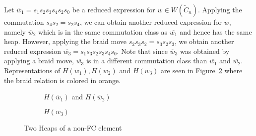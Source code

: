 \begin{example}
Let $\overline{w}_1=s_1s_2s_3s_4s_2s_0$ be a reduced expression for $w \in W(\widetilde{C}_n)$. Applying the commutation $s_4s_2=s_2s_4$, we can obtain another reduced expression for $w$, namely $\overline{w}_2$ which is in the same commutation class as $\overline{w_1}$ and hence has the same heap. However, applying the braid move $s_2s_3s_2=s_3s_2s_3$, we obtain another reduced expression $\overline{w_3}=s_1s_3s_2s_3s_4s_0$. Note that since $\overline{w}_3$ was obtained by applying a braid move, $\overline{w_3}$ is in a different commutation class than $\overline{w_1}$ and $\overline{w_2}$. Representations of $H(\overline{w}_1), H(\overline{w}_2)$ and $H(\overline{w_3})$ are seen in Figure~\ref{fig:not FC} where the braid relation is colored in orange.

\begin{figure}[h]
\centering
\begin{subfigure}[b]{0.3\textwidth}	
\centering
{}
\caption{$H(\overline{w}_1)$ and $H(\overline{w}_2)$}
\end{subfigure}
\begin{subfigure}[b]{0.3\textwidth}	
\centering
{}
\caption{$H(\overline{w}_3)$}
\label{fig:not FC}
\end{subfigure}
\caption{Two Heaps of a non-FC element}	
\end{figure}

\end{example}

 